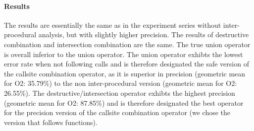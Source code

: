 \paragraph{Results} The results are essentially the same as in the experiment series without inter-procedural analysis, but with slightly higher precision. The results of destructive combination and intersection combination are the same. The true union operator is overall inferior to the union operator. The union operator exhibts the lowest error rate when not following calls and is therefore designated the safe version of the callsite combination operator, as it is superior in precision (geometric mean for O2: 35.79\%) to the non inter-procedural version (geometric mean for O2: 26.55\%). The destructive/intersection operator exhibts the highest precision (geometric mean for O2: 87.85\%) and is therefore designated the best operator for the precision version of the callsite combination operator (we chose the version that follows functions).

